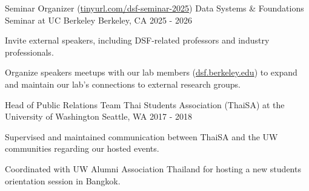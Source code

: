 

\begin{cventries}

  \cventry
    {Seminar Organizer (\href{https://docs.google.com/document/d/1mrAN8iRbkJ8CuHf8pmpNL8rC_tVi4mI5XcrlXfq-VBA/edit?usp=sharing}{tinyurl.com/dsf-seminar-2025})} %
    {Data Systems \& Foundations Seminar at UC Berkeley} %
    {Berkeley, CA} %
    {2025 - 2026} %
    {
      \begin{cvitems} %
        \item {Invite external speakers, including DSF-related professors and industry professionals.}
        \item {Organize speakers meetups with our lab members (\href{https://dsf.berkeley.edu/}{dsf.berkeley.edu}) to expand and maintain our lab's connections to external research groups.}
      \end{cvitems}
    }

  \cventry
    {Head of Public Relations Team} %
    {Thai Students Association (ThaiSA) at the University of Washington} %
    {Seattle, WA} %
    {2017 - 2018} %
    {
      \begin{cvitems} %
        \item {Supervised and maintained communication between ThaiSA and the UW communities regarding our hosted events.}
        \item {Coordinated with UW Alumni Association Thailand for hosting a new students orientation session in Bangkok.}
      \end{cvitems}
    }

\end{cventries}
